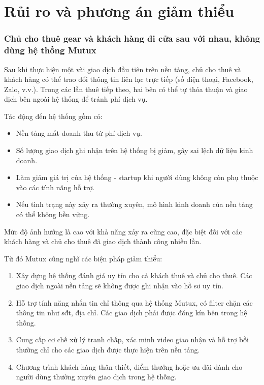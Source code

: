 \section{Rủi ro và phương án giảm thiểu}



\subsubsection{Chủ cho thuê gear và khách hàng đi cửa sau với nhau, không dùng hệ thống Mutux}

Sau khi thực hiện một vài giao dịch đầu tiên trên nền tảng, chủ cho thuê và khách hàng có thể trao đổi thông tin liên lạc trực tiếp (số điện thoại, Facebook, Zalo, v.v.). Trong các lần thuê tiếp theo, hai bên có thể tự thỏa thuận và giao dịch bên ngoài hệ thống để tránh phí dịch vụ.

Tác động đến hệ thống gồm có:
\begin{itemize}
    \item Nền tảng mất doanh thu từ phí dịch vụ.
    \item Số lượng giao dịch ghi nhận trên hệ thống bị giảm, gây sai lệch dữ liệu kinh doanh.
    \item Làm giảm giá trị của hệ thống - startup khi người dùng không còn phụ thuộc vào các tính năng hỗ trợ.
    \item Nếu tình trạng này xảy ra thường xuyên, mô hình kinh doanh của nền tảng có thể không bền vững.
\end{itemize}

Mức độ ảnh hưởng là cao với khả năng xảy ra cũng cao, đặc biệt đối với các khách hàng và chủ cho thuê đã giao dịch thành công nhiều lần.

Từ đó Mutux cũng nghĩ các biện pháp giảm thiểu: 

\begin{enumerate}
    \item Xây dựng hệ thống đánh giá uy tín cho cả khách thuê và chủ cho thuê. Các giao dịch ngoài nền tảng sẽ không được ghi nhận vào hồ sơ uy tín.
    \item Hỗ trợ tính năng nhắn tin chỉ thông qua hệ thống Mutux, có filter chặn các thông tin như sđt, địa chỉ. Các giao dịch phải được đóng kín bên trong hệ thống.
    \item Cung cấp cơ chế xử lý tranh chấp, xác minh video giao nhận và hỗ trợ bồi thường chỉ cho các giao dịch được thực hiện trên nền tảng.
    \item Chương trình khách hàng thân thiết, điểm thưởng hoặc ưu đãi dành cho người dùng thường xuyên giao dịch trong hệ thống.
\end{enumerate}

